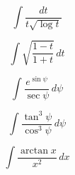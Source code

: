 \documentclass[12pt, letterpaper]{article}
\begin{document}
$$ \int \frac{dt}{t\sqrt{\log{t}}} $$

\vspace*{0.7in}

$$ \int \sqrt{\frac{1 - t}{1 + t}} \, dt $$

\vspace*{0.7in}

$$ \int \frac{e^{\sin{\psi}}}{\sec{\psi}} \, d\psi $$

\vspace*{0.7in}

$$ \int \frac{\tan^3{\psi}}{\cos^3{\psi}} \, d\psi $$

\vspace*{0.7in}

$$ \int \frac{\arctan{x}}{x^2} \, dx $$
\end{document}
